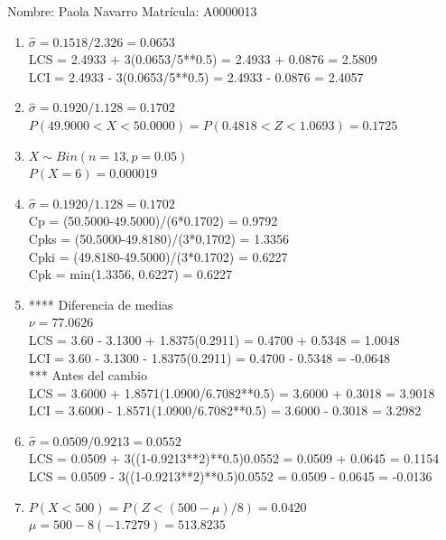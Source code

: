\documentclass[8pt]{report}
\begin{document}
 \newpage

Nombre: \underline{\hspace*{.2in}}
Paola Navarro
\underline{\hspace*{.2in}} \quad Matr\'icula:\underline{\hspace*{.2in}}
A0000013
\underline{\hspace*{.2in}} \\

\begin{enumerate}
\item $\hat\sigma = 0.1518/2.326 = 0.0653$\\
LCS = 2.4933 + 3(0.0653/5**0.5) = 2.4933 + 0.0876 = 2.5809\\
LCI = 2.4933 - 3(0.0653/5**0.5) = 2.4933 - 0.0876 = 2.4057
\item $\hat\sigma = 0.1920/1.128 = 0.1702$\\
$P(49.9000 < X < 50.0000) = P(0.4818 < Z < 1.0693) = 0.1725$\\
\item $X \sim Bin(n=13, p=0.05)$\\
$P(X = 6) = 0.000019$
\item $\hat\sigma = 0.1920/1.128 = 0.1702$\\
Cp = (50.5000-49.5000)/(6*0.1702) = 0.9792\\
Cpks = (50.5000-49.8180)/(3*0.1702) = 1.3356\\
Cpki = (49.8180-49.5000)/(3*0.1702) = 0.6227\\
Cpk = min(1.3356, 0.6227) = 0.6227
\item **** Diferencia de medias\\
$\nu = 77.0626$\\
LCS = 3.60 - 3.1300 + 1.8375(0.2911) = 0.4700 + 0.5348 = 1.0048\\
LCI = 3.60 - 3.1300 - 1.8375(0.2911) = 0.4700 - 0.5348 = -0.0648\\
*** Antes del cambio\\
LCS = 3.6000 + 1.8571(1.0900/6.7082**0.5) = 3.6000 + 0.3018 = 3.9018\\
LCI = 3.6000 - 1.8571(1.0900/6.7082**0.5) = 3.6000 - 0.3018 = 3.2982\\
\item $\hat\sigma = 0.0509/0.9213 = 0.0552$\\
LCS = 0.0509 + 3((1-0.9213**2)**0.5)0.0552 = 0.0509 + 0.0645 = 0.1154\\
LCS = 0.0509 - 3((1-0.9213**2)**0.5)0.0552 = 0.0509 - 0.0645 = -0.0136
\item $P(X < 500) = P(Z < (500-\mu)/8) = 0.0420$\\
$\mu = 500 - 8(-1.7279) = 513.8235$\\
\end{enumerate}
\end{document}
